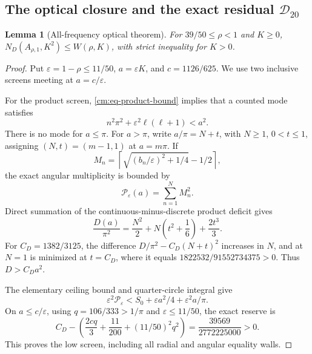 \documentclass[11pt]{article}
\numberwithin{equation}{section}
\newtheorem{lemma}[theorem]{Lemma}
\theoremstyle{definition}
\theoremstyle{remark}
\begin{document}
\subsection{The optical closure and the exact residual
\texorpdfstring{\(\mathcal D_{20}\)}{D20}}

\begin{lemma}[All-frequency optical theorem]
\label{cm:lem-optical}
For \(39/50\leq\rho<1\) and \(K\geq0\),
\(N_D(A_{\rho,1},K^2)\leq W(\rho,K)\), with strict inequality for
\(K>0\).
\end{lemma}

\begin{proof}
Put \(\varepsilon=1-\rho\leq11/50\),
\(a=\varepsilon K\), and \(c=1126/625\).  We use two inclusive screens
meeting at \(a=c/\varepsilon\).

For the product screen, \eqref{cm:eq-product-bound} implies that a counted
mode satisfies
\[
 n^2\pi^2+\varepsilon^2\ell(\ell+1)<a^2.
\]
There is no mode for \(a\leq\pi\).  For \(a>\pi\), write
\(a/\pi=N+t\), with \(N\geq1\), \(0<t\leq1\), assigning
\((N,t)=(m-1,1)\) at \(a=m\pi\).  If
\[
 M_n=\left\lceil\sqrt{(b_n/\varepsilon)^2+1/4}-1/2\right\rceil,
\]
the exact angular multiplicity is bounded by
\[
 \mathcal P_\varepsilon(a)=\sum_{n=1}^N M_n^2.
\]
Direct summation of the continuous-minus-discrete product deficit gives
\begin{equation}
 \frac{D(a)}{\pi^2}=\frac{N^2}{2}
 +N\left(t^2+\frac16\right)+\frac{2t^3}{3}.
 \label{cm:eq-optical-product-deficit}
\end{equation}
For \(C_D=1382/3125\), the difference
\(D/\pi^2-C_D(N+t)^2\) increases in \(N\), and at \(N=1\) is minimized
at \(t=C_D\), where it equals
\(1822532/91552734375>0\).  Thus \(D>C_Da^2\).

The elementary ceiling bound and quarter-circle integral give
\[
 \varepsilon^2\mathcal P_\varepsilon
 <S_0+\varepsilon a^2/4+\varepsilon^2a/\pi.
\]
On \(a\leq c/\varepsilon\), using \(q=106/333>1/\pi\) and
\(\varepsilon\leq11/50\), the exact reserve is
\begin{equation}
 C_D-\left(\frac{2cq}{3}+\frac{11}{200}
 +(11/50)^2q^2\right)
 =\frac{39569}{2772225000}>0.
 \label{cm:eq-optical-low-reserve}
\end{equation}
This proves the low screen, including all radial and angular equality walls.


\end{proof}
\end{document}
